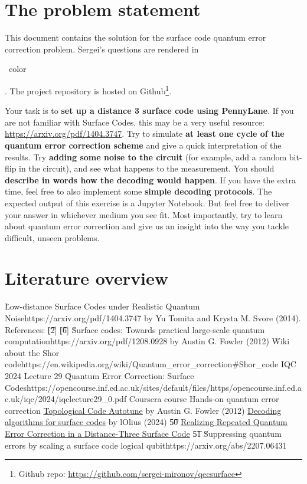 \section{The problem statement}

This document contains the solution for the surface code quantum error correction problem. Sergei's
questions are rendered in \begin{\QuestionColor}\QuestionColorName\ color\end{\QuestionColor}. The
project repository is hosted on
Github\footnote{Github repo: \url{https://github.com/sergei-mironov/qecsurface}}.

\vsp

Your task is to \textbf{set up a distance 3 surface code using PennyLane}. If you are not familiar
with Surface Codes, this may be a very useful resource: \url{https://arxiv.org/pdf/1404.3747}. Try
to simulate \textbf{at least one cycle of the quantum error correction scheme} and give a quick
interpretation of the results. Try \textbf{adding some noise to the circuit} (for example, add a
random bit-flip in the circuit), and see what happens to the measurement. You should
\textbf{describe in words how the decoding would happen}. If you have the extra time, feel free to
also implement some \textbf{simple decoding protocols}. The expected output of this exercise is a
Jupyter Notebook. But feel free to deliver your answer in whichever medium you see fit. Most
importantly, try to learn about quantum error correction and give us an insight into the way you
tackle difficult, unseen problems.


\section{Literature overview}

\ls \u{Low-distance Surface Codes under Realistic Quantum Noise}{https://arxiv.org/pdf/1404.3747}
    by Yu Tomita and Krysta M. Svore (2014). References:
    \ls \t{[2]} 
    \li \t{[6]} \u{Surface codes: Towards practical large-scale quantum computation}{https://arxiv.org/pdf/1208.0928}
        by Austin G. Fowler (2012)
    \le
\li \u{Wiki about the Shor code}{https://en.wikipedia.org/wiki/Quantum_error_correction\#Shor_code}
\li IQC 2024 Lecture 29 \u{Quantum Error Correction: Surface Codes}{https://opencourse.inf.ed.ac.uk/sites/default/files/https/opencourse.inf.ed.ac.uk/iqc/2024/iqclecture29_0.pdf}
\li Coursera course Hands-on quantum error correction
    \ls \href{https://journals.aps.org/prx/pdf/10.1103/PhysRevX.2.041003}{Topological Code Autotune}
        by Austin G. Fowler (2012)
    \le
\li \href{https://arxiv.org/abs/2307.14989}{Decoding algorithms for surface codes} by lOlius (2024)
    \ls \t{50} \href{https://arxiv.org/abs/2112.03708}{Realizing Repeated Quantum Error Correction in a Distance-Three Surface Code}
    \li \t{51} \u{Suppressing quantum errors by scaling a surface code logical qubit}{https://arxiv.org/abs/2207.06431}
    \le
\li {}
\le



